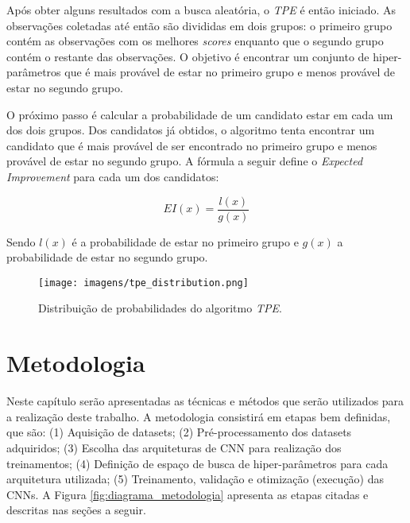 \documentclass[
12pt,				%
openright,			%
oneside,			%
a4paper,			%
english,			%
french,				%
spanish,			%
brazil				%
]{abntex2}
\begin{document}
Após obter alguns resultados com a busca aleatória, o \textit{TPE} é então iniciado. As observações coletadas até então são divididas em dois grupos: o primeiro grupo contém as observações com os melhores \textit{scores} enquanto que o segundo grupo contém o restante das observações. O objetivo é encontrar um conjunto de hiper-parâmetros que é mais provável de estar no primeiro grupo e menos provável de estar no segundo grupo.

O próximo passo é calcular a probabilidade de um candidato estar em cada um dos dois grupos. Dos candidatos já obtidos, o algoritmo tenta encontrar um candidato que é mais provável de ser encontrado no primeiro grupo e menos provável de estar no segundo grupo. A fórmula a seguir define o \textit{Expected Improvement} para cada um dos candidatos:

\[EI(x) = \frac{l(x)}{g(x)}\]

Sendo $l(x)$ é a probabilidade de estar no primeiro grupo e $g(x)$ a probabilidade de estar no segundo grupo.

\begin{figure}[ht]
\centering
\caption{Distribuição de probabilidades do algoritmo \textit{TPE}.}
\texttt{[image: imagens/tpe\_distribution.png]}
\label{fig:tpe_distribution}
\end{figure}


\chapter{Metodologia} \label{metodologia}

Neste capítulo serão apresentadas as técnicas e métodos que serão utilizados para a realização deste trabalho.
A metodologia consistirá em etapas bem definidas, que são: (1) Aquisição de datasets; (2) Pré-processamento dos datasets adquiridos; (3) Escolha das arquiteturas de CNN para realização dos treinamentos; (4) Definição de espaço de busca de hiper-parâmetros para cada arquitetura utilizada; (5) Treinamento, validação e otimização (execução) das CNNs. A Figura \ref{fig:diagrama_metodologia} apresenta as etapas citadas e descritas nas seções a seguir.
	
\end{document}
